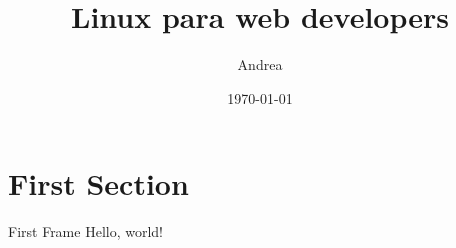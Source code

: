 \documentclass{beamer}
\title{Linux para web developers}
\date{\today}
\author{Andrea}
\institute{Laboratoria}
\begin{document}
  \maketitle
  \section{First Section}
  \begin{frame}{First Frame}
    Hello, world!
  \end{frame}
\end{document}
